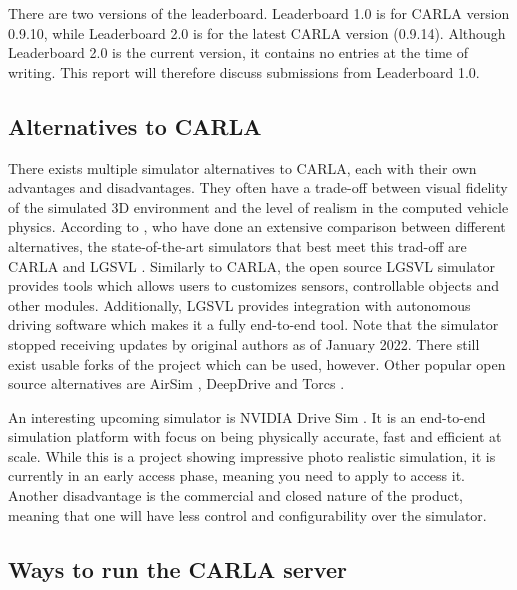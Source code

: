There are two versions of the leaderboard. Leaderboard 1.0 is for CARLA version 0.9.10, while Leaderboard 2.0 is for the latest CARLA version (0.9.14). Although Leaderboard 2.0 is the current version, it contains no entries at the time of writing. This report will therefore discuss submissions from Leaderboard 1.0.


\subsection{Alternatives to CARLA}
There exists multiple simulator alternatives to CARLA, each with their own advantages and disadvantages. They often have a trade-off between visual fidelity of the simulated 3D environment and the level of realism in the computed vehicle physics. According to \textcite{carla-an-inside-out}, who have done an extensive comparison between different alternatives, the state-of-the-art simulators that best meet this trad-off are CARLA and LGSVL \cite{LGSVL-simulator}. Similarly to CARLA, the open source LGSVL simulator provides tools which allows users to customizes sensors, controllable objects and other modules. Additionally, LGSVL provides integration with autonomous driving software which makes it a fully end-to-end tool. Note that the simulator stopped receiving updates by original authors as of January 2022. There still exist usable forks of the project which can be used, however. Other popular open source alternatives are AirSim \cite{airsim}, DeepDrive \cite{deepdrive} and Torcs \cite{torcs}.

An interesting upcoming simulator is NVIDIA Drive Sim \cite{nvidia-drive-sim}. It is an end-to-end simulation platform with focus on being physically accurate, fast and efficient at scale. While this is a project showing impressive photo realistic simulation, it is currently in an early access phase, meaning you need to apply to access it. Another disadvantage is the commercial and closed nature of the product, meaning that one will have less control and configurability over the simulator.


\subsection{Ways to run the CARLA server}

